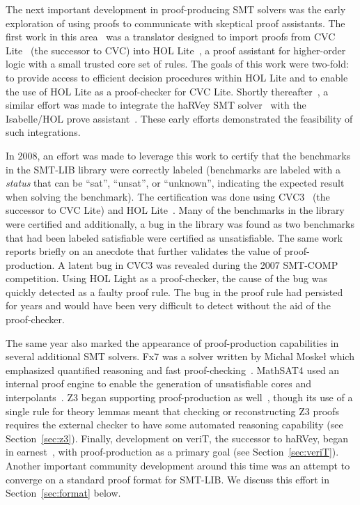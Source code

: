 \documentclass{llncs}
\begin{document}
The next important development in proof-producing SMT solvers was the
early exploration of using proofs to communicate with skeptical proof
assistants.  The first work in this area~\cite{MBG06} was a translator designed
to import proofs from CVC Lite~\cite{BB04} (the successor to CVC) into HOL
Lite~\cite{H96}, a proof assistant for higher-order logic with a small trusted
core set of rules.  The goals of this work were two-fold: to provide access to
efficient decision procedures within HOL Lite and to enable the use of HOL Lite
as a proof-checker for CVC Lite.  Shortly thereafter~\cite{FMM+06,HCF+07}, a similar effort was
made to integrate the haRVey SMT solver~\cite{DR03} with the Isabelle/HOL prove
assistant~\cite{NPW02}. These early efforts demonstrated the feasibility of such
integrations.

In 2008, an effort was made to leverage this work to certify that the
benchmarks in the SMT-LIB library were correctly labeled (benchmarks are
labeled with a \emph{status} that can be ``sat'', ``unsat'', or ``unknown'',
indicating the expected result when solving the benchmark).  The certification
was done using CVC3~\cite{BT07} (the successor to CVC Lite) and
HOL Lite~\cite{GB08}.  Many of the benchmarks in the library were certified and
additionally, a bug in the library was found as two benchmarks that had been
labeled satisfiable were certified as unsatisfiable.
The same work reports briefly on an anecdote that further validates the value
of proof-production.  A latent bug in CVC3 was revealed during the 2007
SMT-COMP competition.  Using HOL Light as a proof-checker, the cause of the bug
was quickly detected as a faulty proof rule.  The bug in the proof rule had
persisted for years and would have been very difficult to detect without the
aid of the proof-checker.

The same year also marked the appearance of proof-production capabilities in
several additional SMT solvers.  Fx7 was a solver written by Michal Moske\l
which emphasized quantified reasoning and fast proof-checking~\cite{M08}.
MathSAT4 used an internal proof engine to enable the generation of
unsatisfiable cores and interpolants~\cite{BCF+08}.  Z3 began supporting
proof-production as well~\cite{dMB08}, though its use of a single rule for
theory lemmas meant that checking or reconstructing Z3 proofs requires the
external checker to have some automated reasoning capability (see
Section~\ref{sec:z3}).  Finally, development on veriT, the successor to haRVey,
began in earnest~\cite{BdOD+09}, with proof-production as a primary goal (see Section~\ref{sec:veriT}).
Another important community development around this time was an attempt to
converge on a standard proof format for SMT-LIB.  We discuss this effort in
Section~\ref{sec:format} below.
\end{document}
